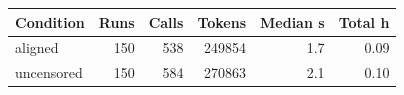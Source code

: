 \begin{tabular}{lrrrrr}
\toprule
Condition & Runs & Calls & Tokens & Median s & Total h \\
\midrule
aligned & 150 & 538 & 249854 & 1.7 & 0.09 \\
uncensored & 150 & 584 & 270863 & 2.1 & 0.10 \\
\bottomrule
\end{tabular}
